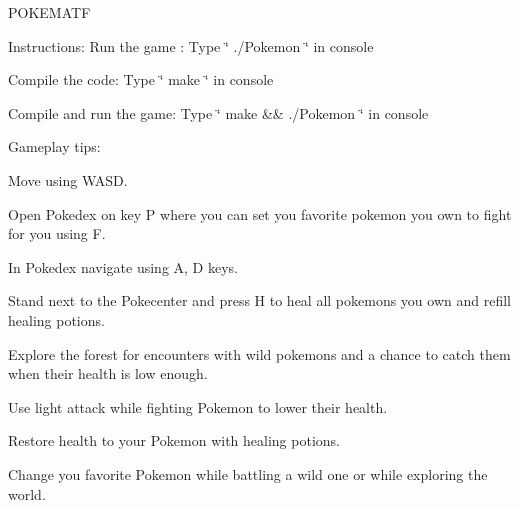 P\+O\+K\+E\+M\+A\+TF

Instructions\+: Run the game \+: Type \char`\"{} ./\+Pokemon \char`\"{} in console

Compile the code\+: Type \char`\"{} make \char`\"{} in console

Compile and run the game\+: Type \char`\"{} make \&\& ./\+Pokemon \char`\"{} in console

Gameplay tips\+:

Move using W\+A\+SD.

Open Pokedex on key P where you can set you favorite pokemon you own to fight for you using F.

In Pokedex navigate using A, D keys.

Stand next to the Pokecenter and press H to heal all pokemons you own and refill healing potions.

Explore the forest for encounters with wild pokemons and a chance to catch them when their health is low enough.

Use light attack while fighting Pokemon to lower their health.

Restore health to your Pokemon with healing potions.

Change you favorite Pokemon while battling a wild one or while exploring the world. 